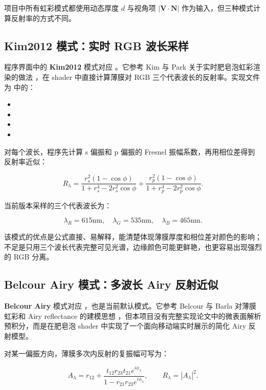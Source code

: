 项目中所有虹彩模式都使用动态厚度 $d$ 与视角项 $|\mathbf{V}\cdot\mathbf{N}|$ 作为输入，但三种模式计算反射率的方式不同。

\subsection{Kim2012 模式：实时 RGB 波长采样}

程序界面中的 \textbf{Kim2012} 模式对应 。它参考 Kim 与 Park 关于实时肥皂泡虹彩渲染的做法 \cite{kim2012soapbubble}，在 shader 中直接计算薄膜对 RGB 三个代表波长的反射率。实现文件为  中的：

\begin{itemize}
  \item {}
  \item {}
  \item {}
  \item {}
\end{itemize}

对每个波长，程序先计算 s 偏振和 p 偏振的 Fresnel 振幅系数，再用相位差得到反射率近似：

\[
R_\lambda =
\frac{r_s^2(1-\cos\phi)}{1+r_s^4-2r_s^2\cos\phi}
+
\frac{r_p^2(1-\cos\phi)}{1+r_p^4-2r_p^2\cos\phi}.
\]

当前版本采样的三个代表波长为：

\[
\lambda_R=615\mathrm{nm},\quad
\lambda_G=535\mathrm{nm},\quad
\lambda_B=465\mathrm{nm}.
\]

该模式的优点是公式直接、易解释，能清楚体现薄膜厚度和相位差对颜色的影响；不足是只用三个波长代表完整可见光谱，边缘颜色可能更鲜艳，也更容易出现强烈的 RGB 分离。


\subsection{Belcour Airy 模式：多波长 Airy 反射近似}

\textbf{Belcour Airy} 模式对应 ，也是当前默认模式。它参考 Belcour 与 Barla 对薄膜虹彩和 Airy reflectance 的建模思想 \cite{belcour2017iridescence}，但本项目没有完整实现论文中的微表面解析预积分，而是在肥皂泡 shader 中实现了一个面向移动端实时展示的简化 Airy 反射模型。

对某一偏振方向，薄膜多次内反射的复振幅可写为：

\[
A_\lambda =
r_{12}
+
\frac{t_{12}r_{23}t_{21}e^{i\phi_\lambda}}
{1-r_{21}r_{23}e^{i\phi_\lambda}},
\qquad
R_\lambda = |A_\lambda|^2.
\]


